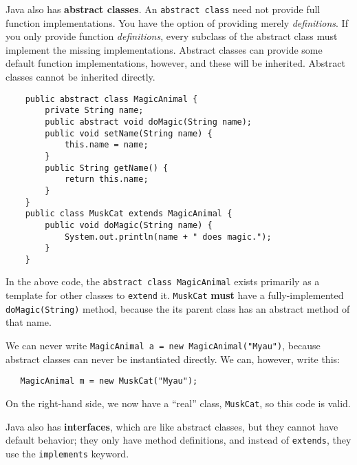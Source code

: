 \documentclass[11pt]{article}
\begin{document}
Java also has \textbf{abstract classes}.  An \texttt{abstract class} need not provide full function implementations.  You have the option of providing merely \textit{definitions}.  If you only provide function \textit{definitions}, every subclass of the abstract class must implement the missing implementations.  Abstract classes can provide some default function implementations, however, and these will be inherited.  Abstract classes cannot be inherited directly.
\begin{verbatim}
    public abstract class MagicAnimal {
    	private String name;
        public abstract void doMagic(String name);
        public void setName(String name) {
        	this.name = name;
        }      
        public String getName() {
        	return this.name;
        }
    } 
    public class MuskCat extends MagicAnimal {
    	public void doMagic(String name) {
        	System.out.println(name + " does magic.");
        }   
    }
\end{verbatim}

In the above code, the \texttt{abstract class MagicAnimal} exists primarily as a template for other classes to \texttt{extend} it.  \texttt{MuskCat} \textbf{must} have a fully-implemented \texttt{doMagic(String)} method, because the its parent class has an abstract method of that name.

We can never write \texttt{MagicAnimal a = new MagicAnimal("Myau")}, because abstract classes can never be instantiated directly.  We can, however, write this:

\begin{verbatim}
   MagicAnimal m = new MuskCat("Myau");
\end{verbatim}
On the right-hand side, we now have a ``real'' class, \texttt{MuskCat}, so this code is valid.  

Java also has \textbf{interfaces}, which are like abstract classes, but they cannot have default behavior; they only have method definitions, and instead of \texttt{extends}, they use the \texttt{implements} keyword.
\end{document}
